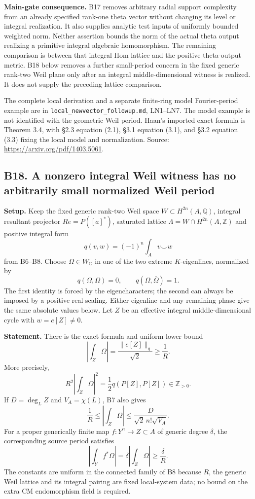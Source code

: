 \textbf{Main-gate consequence.} B17 removes arbitrary radial support complexity from an already specified rank-one theta vector without changing its level or integral realization. It also supplies analytic test inputs of uniformly bounded weighted norm. Neither assertion bounds the norm of the actual theta output realizing a primitive integral algebraic homomorphism. The remaining comparison is between that integral Hom lattice and the positive theta-output metric. B18 below removes a further small-period concern in the fixed generic rank-two Weil plane only after an integral middle-dimensional witness is realized. It does not supply the preceding lattice comparison.

The complete local derivation and a separate finite-ring model Fourier-period example are in \texttt{local\_newvector\_followup.md}, LN1--LN7. The model example is not identified with the geometric Weil period. Haan's imported exact formula is Theorem 3.4, with §2.3 equation (2.1), §3.1 equation (3.1), and §3.2 equation (3.3) fixing the local model and normalization. Source: \url{https://arxiv.org/pdf/1403.5061}.

\subsection{B18. A nonzero integral Weil witness has no arbitrarily small normalized Weil period}\label{b18.-a-nonzero-integral-weil-witness-has-no-arbitrarily-small-normalized-weil-period}

\textbf{Setup.} Keep the fixed generic rank-two Weil space \(W\subset H^{2n}(A,\mathbb Q)\), integral resultant projector \(Re=P([a]^*)\), saturated lattice \(\Lambda=W\cap H^{2n}(A,\mathbb Z)\) and positive integral form \[
 q(v,w)=(-1)^n\int_Av\smile w
\] from B6--B8. Choose \(\Omega\in W_\mathbb C\) in one of the two extreme \(K\)-eigenlines, normalized by \[
 q(\Omega,\Omega)=0,\qquad q(\Omega,\overline\Omega)=1.
\tag{B18.1}
\] The first identity is forced by the eigencharacters; the second can always be imposed by a positive real scaling. Either eigenline and any remaining phase give the same absolute values below. Let \(Z\) be an effective integral middle-dimensional cycle with \(w=e[Z]\ne0\).

\textbf{Statement.} There is the exact formula and uniform lower bound \[
 \left|\int_Z\Omega\right|
 =\frac{\|e[Z]\|_q}{\sqrt2}
 \ge\frac1R.
\tag{B18.2}
\] More precisely, \[
 R^2\left|\int_Z\Omega\right|^2
      =\frac12q(P[Z],P[Z])\in\mathbb Z_{>0}.
\tag{B18.3}
\] If \(D=\deg_L Z\) and \(V_A=\chi(L)\), B7 also gives \[
 \frac1R
 \le\left|\int_Z\Omega\right|
 \le\frac{D}{\sqrt2\,n!\sqrt{V_A}}.
\tag{B18.4}
\] For a proper generically finite map \(f:Y^n\to Z\subset A\) of generic degree \(\delta\), the corresponding source period satisfies \[
 \left|\int_Yf^*\Omega\right|
 =\delta\left|\int_Z\Omega\right|
 \ge\frac{\delta}{R}.
\tag{B18.5}
\] The constants are uniform in the connected family of B8 because \(R\), the generic Weil lattice and its integral pairing are fixed local-system data; no bound on the extra CM endomorphism field is required.

